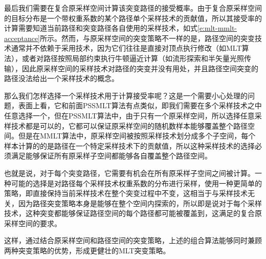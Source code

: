最后我们需要在复合原采样空间计算该突变路径的接受概率。由于复合原采样空间的目标分布是一个带权重系数的某个路径单个采样技术的贡献值，所以其接受率的计算需要知道当前路径和突变路径各自使用的采样技术，如式\ref{e:mlt-mmlt-acceptance}所示。然而，与原采样空间的突变策略不一样的是，路径空间的突变技术通常并不依赖于采用技术，因为它们往往是直接对顶点执行修改（如MLT算法），或者对路径按照局部约束执行牛顿逼近计算（如流形探索和半矢量光照传输），因此原采样空间的采样技术对路径的突变并没有用处，并且路径空间突变的路径没法给出一个采样技术的概念。

那么我们怎样选择一个采样技术用于计算接受率呢？这是一个需要小心处理的问题，表面上看，它和前面PSSMLT算法有点类似，即我们需要在多个采样技术之中任意选择一个，但在PSSMLT算法中，由于只有一个原采样空间，所以选择任意采样技术都是可以的，它都可以保证原采样空间的随机数样本能够覆盖整个路径空间。但是在MMLT算法中，原采样空间被按照采样技术划分成多个子空间，每个样本计算的的是路径在一个特定采样技术下的贡献值，所以这种采样技术的选择必须满足能够保证所有原采样子空间都能够各自覆盖整个路径空间。

也就是说，对于每个突变路径，它需要有机会在所有原采样子空间之间被计算。一种可能的选择是对路径每个采样技术权重系数的分布进行采样，\cite{a:FusingStateSpacesforMarkovChainMonteCarloRendering}使用一种更简单的策略，即直接保持当前采样技术在整个突变过程中不变，这相当于与采样技术无关，因为路径突变策略本身是能够在整个空间内探索的，所以即是说对于每个采样技术，这种突变都能够保证路径空间的每个路径都可能被覆盖到，这满足的复合原采样空间的要求。

这样，通过结合原采样空间和路径空间的突变策略，上述的组合算法能够同时兼顾两种突变策略的优势，形成更健壮的MLT突变策略。












